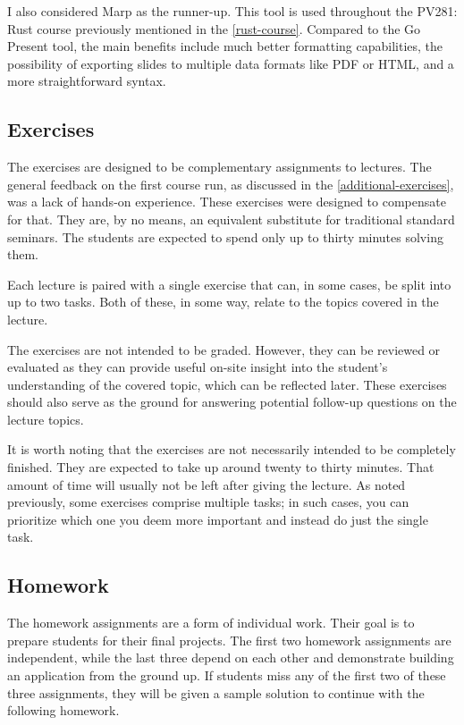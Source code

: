 \documentclass[
  digital,
  color,
  oneside,
  nosansbold,
  nocolorbold,
  nolof,
  nolot,
]{fithesis4}
\begin{document}
I also considered Marp\cite{marp} as the runner-up. This tool is used throughout the PV281: Rust course previously mentioned in the \cref{rust-course}. Compared to the Go Present tool, the main benefits include much better formatting capabilities, the possibility of exporting slides to multiple data formats like PDF or HTML, and a more straightforward syntax.

\subsection{Exercises}\label{exercises}

The exercises are designed to be complementary assignments to lectures. The general feedback on the first course run, as discussed in the \cref{additional-exercises}, was a lack of hands-on experience. These exercises were designed to compensate for that. They are, by no means, an equivalent substitute for traditional standard seminars. The students are expected to spend only up to thirty minutes solving them.

Each lecture is paired with a single exercise that can, in some cases, be split into up to two tasks. Both of these, in some way, relate to the topics covered in the lecture.

The exercises are not intended to be graded. However, they can be reviewed or evaluated as they can provide useful on-site insight into the student's understanding of the covered topic, which can be reflected later. These exercises should also serve as the ground for answering potential follow-up questions on the lecture topics.

It is worth noting that the exercises are not necessarily intended to be completely finished. They are expected to take up around twenty to thirty minutes. That amount of time will usually not be left after giving the lecture. As noted previously, some exercises comprise multiple tasks; in such cases, you can prioritize which one you deem more important and instead do just the single task.

\subsection{Homework}\label{design-homework}

The homework assignments are a form of individual work. Their goal is to prepare students for their final projects. The first two homework assignments are independent, while the last three depend on each other and demonstrate building an application from the ground up. If students miss any of the first two of these three assignments, they will be given a sample solution to continue with the following homework.
\end{document}
